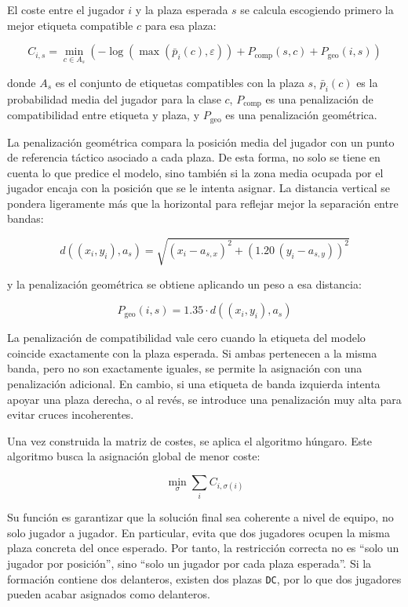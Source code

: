 El coste entre el jugador \(i\) y la plaza esperada \(s\) se calcula escogiendo primero la mejor etiqueta compatible \(c\) para esa plaza:

\[
C_{i,s} =
\min_{c \in A_s}
\left(
-\log(\max(\bar{p}_i(c), \varepsilon))
+
P_{\text{comp}}(s,c)
+
P_{\text{geo}}(i,s)
\right)
\]

donde \(A_s\) es el conjunto de etiquetas compatibles con la plaza \(s\), \(\bar{p}_i(c)\) es la probabilidad media del jugador para la clase \(c\), \(P_{\text{comp}}\) es una penalización de compatibilidad entre etiqueta y plaza, y \(P_{\text{geo}}\) es una penalización geométrica.

La penalización geométrica compara la posición media del jugador con un punto de referencia táctico asociado a cada plaza. De esta forma, no solo se tiene en cuenta lo que predice el modelo, sino también si la zona media ocupada por el jugador encaja con la posición que se le intenta asignar. La distancia vertical se pondera ligeramente más que la horizontal para reflejar mejor la separación entre bandas:

\[
d((x_i,y_i), a_s) =
\sqrt{
(x_i - a_{s,x})^2
+
\left(1.20\,(y_i - a_{s,y})\right)^2
}
\]

y la penalización geométrica se obtiene aplicando un peso a esa distancia:

\[
P_{\text{geo}}(i,s) = 1.35 \cdot d((x_i,y_i), a_s)
\]

La penalización de compatibilidad vale cero cuando la etiqueta del modelo coincide exactamente con la plaza esperada. Si ambas pertenecen a la misma banda, pero no son exactamente iguales, se permite la asignación con una penalización adicional. En cambio, si una etiqueta de banda izquierda intenta apoyar una plaza derecha, o al revés, se introduce una penalización muy alta para evitar cruces incoherentes.

Una vez construida la matriz de costes, se aplica el algoritmo húngaro. Este algoritmo busca la asignación global de menor coste:

\[
\min_{\sigma}
\sum_i C_{i,\sigma(i)}
\]

Su función es garantizar que la solución final sea coherente a nivel de equipo, no solo jugador a jugador. En particular, evita que dos jugadores ocupen la misma plaza concreta del once esperado. Por tanto, la restricción correcta no es ``solo un jugador por posición'', sino ``solo un jugador por cada plaza esperada''. Si la formación contiene dos delanteros, existen dos plazas \texttt{DC}, por lo que dos jugadores pueden acabar asignados como delanteros.

